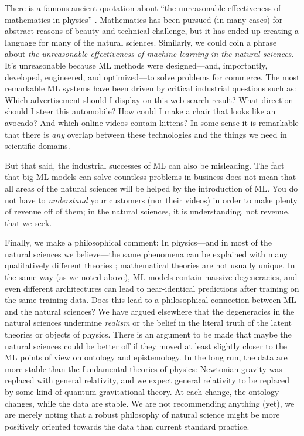 \documentclass[11pt]{article}
\begin{document}
There is a famous ancient quotation about ``the unreasonable effectiveness of mathematics in physics'' \cite{weiner_maybe}.
Mathematics has been pursued (in many cases) for abstract reasons of beauty and technical challenge, but it has ended up creating a language for many of the natural sciences.
Similarly, we could coin a phrase about \emph{the unreasonable effectiveness of machine learning in the natural sciences}.
It's unreasonable because ML methods were designed---and, importantly, developed, engineered, and optimized---to solve problems for commerce.
The most remarkable ML systems have been driven by critical industrial questions such as: Which advertisement should I display on this web search result? What direction should I steer this automobile? How could I make a chair that looks like an avocado? And which online videos contain kittens?
In some sense it is remarkable that there is \emph{any} overlap between these technologies and the things we need in scientific domains.

But that said, the industrial successes of ML can also be misleading.
The fact that big ML models can solve countless problems in business does not mean that all areas of the natural sciences will be helped by the introduction of ML.
You do not have to \emph{understand} your customers (nor their videos) in order to make plenty of revenue off of them; in the natural sciences, it is understanding, not revenue, that we seek.

Finally, we make a philosophical comment:
In physics---and in most of the natural sciences we believe---the same phenomena can be explained with many qualitatively different theories \cite{philosphy_of_physics}; mathematical theories are not usually unique.
In the same way (as we noted above), ML models contain massive degeneracies, and even different architectures can lead to near-identical predictions after training on the same training data.
Does this lead to a philosophical connection between ML and the natural sciences?
We have argued elsewhere \cite{hogg} that the degeneracies in the natural sciences undermine \emph{realism} or the belief in the literal truth of the latent theories or objects of physics.
There is an argument to be made that maybe the natural sciences could be better off if they moved at least slightly closer to the ML points of view on ontology and epistemology.
In the long run, the data are more stable than the fundamental theories of physics:
Newtonian gravity was replaced with general relativity, and we expect general relativity to be replaced by some kind of quantum gravitational theory.
At each change, the ontology changes, while the data are stable.
We are not recommending anything (yet), we are merely noting that a robust philosophy of natural science might be more positively oriented towards the data than current standard practice.
\end{document}
